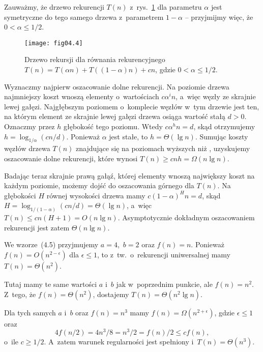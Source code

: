 \exercise %
Zauważmy, że drzewo rekurencji $T(n)$ z~rys.~\ref{fig:4.2-5} dla parametru $\alpha$ jest symetryczne do tego samego drzewa z~parametrem $1-\alpha$ -- przyjmijmy więc, że $0<\alpha\le1/2$.
\begin{figure}[ht]
	\begin{center}
		\texttt{[image: fig04.4]}
	\end{center}
	\caption{Drzewo rekursji dla równania rekurencyjnego $T(n)=T(\alpha n)+T((1-\alpha)n)+cn$, gdzie $0<\alpha\le1/2$.} \label{fig:4.2-5}
\end{figure}

Wyznaczmy najpierw oszacowanie dolne rekurencji. Na  poziomie drzewa najmniejszy koszt wnoszą elementy o~wartościach $c\alpha^in$, a~więc węzły ze skrajnie lewej gałęzi. Najgłębszym poziomem o~komplecie węzłów w~tym drzewie jest ten, na którym element ze skrajnie lewej gałęzi drzewa osiąga wartość stałą $d>0$. Oznaczmy przez $h$ głębokość tego poziomu. Wtedy $c\alpha^hn=d$, skąd otrzymujemy $h=\log_{1/\alpha}(cn/d)$. Ponieważ $\alpha$ jest stałe, to $h=\Theta(\lg n)$. Sumując koszty węzłów drzewa $T(n)$ znajdujące się na poziomach wyższych niż , uzyskujemy oszacowanie dolne rekurencji, które wynosi $T(n)\ge cnh=\Omega(n\lg n)$.

Badając teraz skrajnie prawą gałąź, której elementy wnoszą największy koszt na każdym poziomie, możemy dojść do oszacowania górnego dla $T(n)$. Na głębokości $H$ równej wysokości drzewa mamy $c(1-\alpha)^Hn=d$, skąd $H=\log_{1/(1-\alpha)}(cn/d)=\Theta(\lg n)$, a~więc $T(n)\le cn(H+1)=O(n\lg n)$. Asymptotycznie dokładnym oszacowaniem rekurencji jest zatem $\Theta(n\lg n)$.


\exercise %

\subexercise
We wzorze~(4.5) przyjmujemy $a=4$,~$b=2$ oraz $f(n)=n$. Ponieważ $f(n)=O(n^{2-\epsilon})$ dla $\epsilon\le1$, to z~tw.~o~rekurencji uniwersalnej mamy $T(n)=\Theta(n^2)$.

\subexercise
Tutaj mamy te same wartości $a$ i~$b$ jak w~poprzednim punkcie, ale $f(n)=n^2$. Z~tego, że $f(n)=\Theta(n^2)$, dostajemy $T(n)=\Theta(n^2\lg n)$.

\subexercise
Dla tych samych $a$ i~$b$ oraz $f(n)=n^3$ mamy $f(n)=\Omega(n^{2+\epsilon})$, gdzie $\epsilon\le1$ oraz
\[
	4f(n/2) = 4n^3\!/8 = n^3\!/2 = f(n)/2 \le cf(n),
\]
o~ile $c\ge1/2$. A~zatem warunek regularności jest spełniony i~$T(n)=\Theta(n^3)$.

